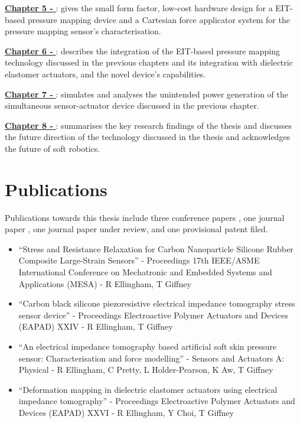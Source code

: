 \hyperref[chapter5]{\textbf{Chapter 5 - \chapvname}}: gives the small form factor, low-cost hardware design for a EIT-based pressure mapping device and a Cartesian force applicator system for the pressure mapping sensor's characterisation.

\hyperref[chapter6]{\textbf{Chapter 6 - \chapviname}}: describes the integration of the EIT-based pressure mapping technology discussed in the previous chapters and its integration with dielectric elastomer actuators, and the novel device's capabilities.

\hyperref[chapter7]{\textbf{Chapter 7 - \chapviiname}}: simulates and analyses the unintended power generation of the simultaneous sensor-actuator device discussed in the previous chapter.

\hyperref[chapter8]{\textbf{Chapter 8 - \chapviiiname}}: summarises the key research findings of the thesis and discusses the future direction of the technology discussed in the thesis and acknowledges the future of soft robotics.

\section{Publications}
Publications towards this thesis include three conference papers \cite{Ellingham2021,Ellingham2022,Ellingham2024a}, one journal paper \cite{Ellingham2024}, one journal paper under review, and one provisional patent filed.
\begin{itemize}
	\item ``Stress and Resistance Relaxation for Carbon Nanoparticle Silicone Rubber Composite Large-Strain Sensors'' - Proceedings 17th IEEE/ASME International Conference on Mechatronic and Embedded Systems and Applications (MESA) - R Ellingham, T Giffney
	\item ``Carbon black silicone piezoresistive electrical impedance tomography stress sensor device'' -  Proceedings Electroactive Polymer Actuators and Devices (EAPAD) XXIV - R Ellingham, T Giffney
	\item ``An electrical impedance tomography based artificial soft skin pressure sensor: Characterisation and force modelling'' - Sensors and Actuators A: Physical - R Ellingham, C Pretty, L Holder-Pearson, K Aw, T Giffney
	\item ``Deformation mapping in dielectric elastomer actuators using electrical impedance tomography'' - Proceedings Electroactive Polymer Actuators and Devices (EAPAD) XXVI - R Ellingham, Y Choi, T Giffney
\end{itemize}

\cleardoublepage